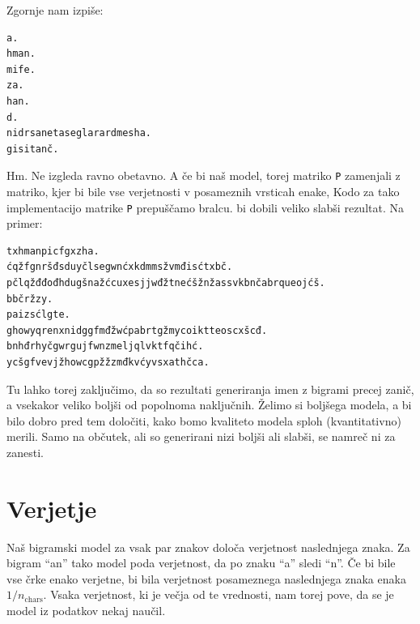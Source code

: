 Zgornje nam izpiše:

\vspace*{3mm}
\begin{lstlisting}
a.
hman.
mife.
za.
han.
d.
nidrsanetaseglarardmesha.
gisitanč.
\end{lstlisting}

Hm. Ne izgleda ravno obetavno. A če bi naš model, torej matriko \texttt{P} zamenjali z matriko, kjer bi bile vse verjetnosti v posameznih vrsticah enake, 
%
Kodo za tako implementacijo matrike \texttt{P} prepuščamo bralcu.
%
bi dobili veliko slabši rezultat. Na primer:
\vspace*{3mm}
\begin{lstlisting}
txhmanpicfgxzha.
ćqžfgnršđsduyčlsegwnćxkdmmsžvmđisćtxbč.
pčlqžđđođhdugšnažćcuxesjjwđžtnećšžnžassvkbnčabrqueojćš.
bbčržzy.
paizsćlgte.
ghowyqrenxnidggfmđžwćpabrtgžmycoiktteoscxšcđ.
bnhđrhyčgwrgujfwnzmeljqlvktfqčihć.
ycšgfvevjžhowcgpžžzmđkvćyvsxathčca.
\end{lstlisting}

Tu lahko torej zaključimo, da so rezultati generiranja imen z bigrami precej zanič, a vsekakor veliko boljši od popolnoma naključnih. Želimo si boljšega modela, a bi bilo dobro pred tem določiti, kako bomo kvaliteto modela sploh (kvantitativno) merili. Samo na občutek, ali so generirani nizi boljši ali slabši, se namreč ni za zanesti.

\section{Verjetje}

Naš bigramski model za vsak par znakov določa verjetnost naslednjega znaka. Za bigram ``an'' tako model poda verjetnost, da po znaku ``a'' sledi ``n''. Če bi bile vse črke enako verjetne, bi bila verjetnost posameznega naslednjega znaka enaka $1/n_{\text{chars}}$. Vsaka verjetnost, ki je večja od te vrednosti, nam torej pove, da se je model iz podatkov nekaj naučil.

